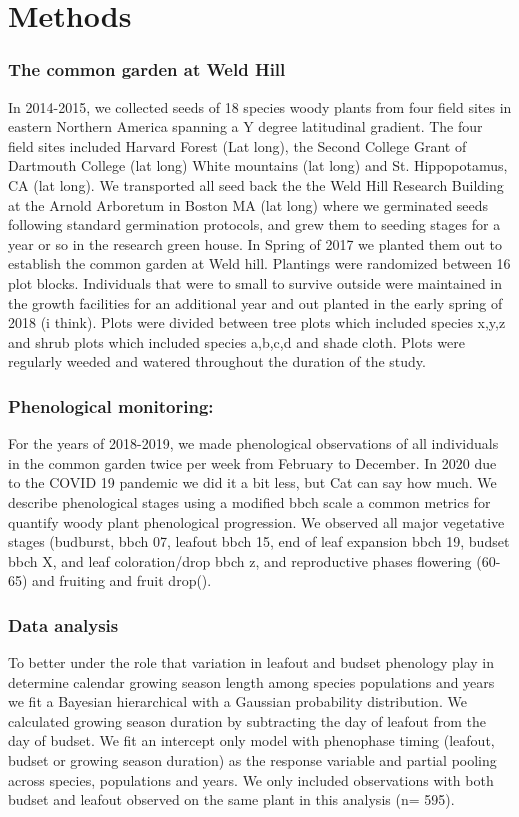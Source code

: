 \documentclass[12 pt]{article}
\begin{document}
\section{Methods}
\subsubsection{The common garden at Weld Hill}
In 2014-2015, we collected seeds of 18 species woody plants from four field sites in eastern Northern America spanning a Y degree latitudinal gradient. The four field sites included Harvard Forest (Lat long), the Second College Grant of Dartmouth College (lat long) White mountains (lat long) and St. Hippopotamus, CA (lat long). We transported all seed back the the Weld Hill Research Building at the Arnold Arboretum in Boston MA (lat long) where we germinated seeds following standard germination protocols, and grew them to seeding stages for a year or so in the research green house. In Spring of 2017 we planted them out to establish the common garden at Weld hill. Plantings were randomized between 16 plot blocks. Individuals that were to small to survive outside were maintained in the growth facilities for an additional year and out planted in the early spring of 2018 (i think). Plots were divided between tree plots which included species x,y,z and shrub plots which included species a,b,c,d and shade cloth. Plots were regularly weeded and watered throughout the duration of the study.

\subsubsection{Phenological monitoring:}
For the years of 2018-2019, we made phenological observations of all individuals in the common garden twice per week from February to December. In 2020 due to the COVID 19 pandemic we did it a bit less, but Cat can say how much. We describe phenological stages using a modified bbch scale \citep{} a common metrics for quantify woody plant phenological progression. We observed all major vegetative stages (budburst, bbch 07, leafout bbch 15, end of leaf expansion bbch 19, budset bbch X, and leaf coloration/drop bbch z, and reproductive phases flowering (60-65) and fruiting and fruit drop(). 

\subsubsection{Data analysis}
To better under the role that variation in leafout and budset phenology play in determine calendar growing season length among species populations and years we fit a Bayesian hierarchical with a Gaussian probability distribution. We calculated growing season duration by subtracting the day of leafout from the day of budset. We fit an intercept only model with phenophase timing (leafout, budset or growing season duration) as the response variable and partial pooling across species, populations and years. We only included observations with both budset and leafout observed on the same plant in this analysis (n= 595).
\end{document}
